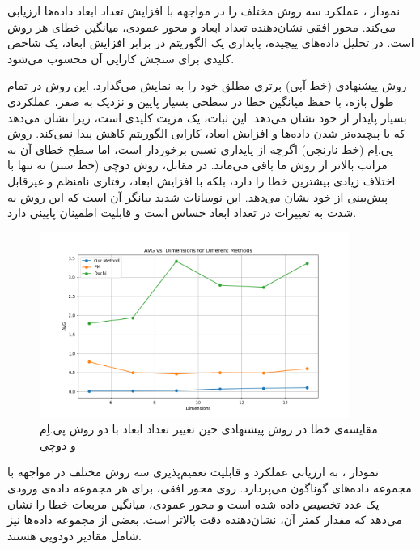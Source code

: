 
نمودار ، عملکرد سه روش مختلف را در مواجهه با افزایش تعداد ابعاد داده‌ها ارزیابی می‌کند. محور افقی نشان‌دهنده تعداد ابعاد و محور عمودی، میانگین خطای هر روش است. در تحلیل داده‌های پیچیده، پایداری یک الگوریتم در برابر افزایش ابعاد، یک شاخص کلیدی برای سنجش کارایی آن محسوب می‌شود.

روش پیشنهادی (خط آبی) برتری مطلق خود را به نمایش می‌گذارد. این روش در تمام طول بازه، با حفظ میانگین خطا در سطحی بسیار پایین و نزدیک به صفر، عملکردی بسیار پایدار از خود نشان می‌دهد. این ثبات، یک مزیت کلیدی است، زیرا نشان می‌دهد که با پیچیده‌تر شدن داده‌ها و افزایش ابعاد، کارایی الگوریتم کاهش پیدا نمی‌کند. روش پی.اِم (خط نارنجی) اگرچه از پایداری نسبی برخوردار است، اما سطح خطای آن به مراتب بالاتر از روش ما باقی می‌ماند. در مقابل، روش دوچی (خط سبز) نه تنها با اختلاف زیادی بیشترین خطا را دارد، بلکه با افزایش ابعاد، رفتاری نامنظم و غیرقابل پیش‌بینی از خود نشان می‌دهد. این نوسانات شدید بیانگر آن است که این روش به شدت به تغییرات در تعداد ابعاد حساس است و قابلیت اطمینان پایینی دارد.

\begin{figure}[h]
  \centering
  \includegraphics[width=0.9\textwidth]{figs/evaluation_dim_avg.png}
  \caption{مقایسه‌ی خطا در روش پیشنهادی حین تغییر تعداد ابعاد با دو روش پی.اِم و دوچی}
  \label{fig:dim_avg}
\end{figure}


نمودار ، به ارزیابی عملکرد و قابلیت تعمیم‌پذیری سه روش مختلف در مواجهه با مجموعه داده‌های گوناگون می‌پردازد. روی محور افقی، برای هر مجموعه داده‌ی ورودی یک عدد تخصیص داده شده است و محور عمودی، میانگین مربعات خطا را نشان می‌دهد که مقدار کمتر آن، نشان‌دهنده دقت بالاتر است. بعضی از مجموعه داده‌ها نیز شامل مقادیر دودویی هستند.

